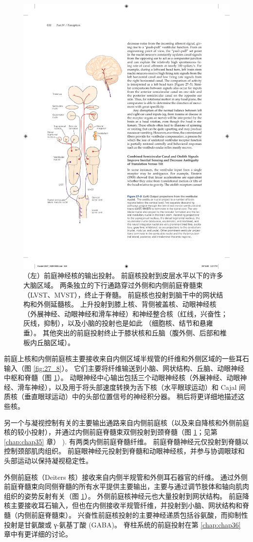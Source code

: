 \begin{figure}[htbp]
	\centering
	\includegraphics[width=0.4\linewidth]{chap27/fig_27_9}
	\caption{（左）前庭神经核的输出投射。 前庭核投射到皮层水平以下的许多大脑区域。 两条独立的下行通路穿过外侧和内侧前庭脊髓束（LVST、MVST），终止于脊髓。 前庭核也投射到脑干中的网状结构和外侧延髓核。 上升投射到膝上核、背侧被盖核、动眼神经核（外展神经、动眼神经和滑车神经）和神经整合核（红线，兴奋性；灰线，抑制），以及小脑的投射也是如此 （细胞核、结节和悬雍垂）。 其他突出的前庭投射终止于膝状核和丘脑（腹外侧、后部和椎板内丘脑区域）。}
	\label{fig:27_9}
\end{figure}

前庭上核和内侧前庭核主要接收来自内侧区域半规管的纤维和外侧区域的一些耳石输入（图 \ref{fig:27_8}）。 它们主要将纤维输送到小脑、网状结构、丘脑、动眼神经中枢和脊髓（图 \ref{fig:27_9}）。 动眼神经中心输出包括三个动眼神经核（外展神经、动眼神经、滑车神经），以及用于将头部速度转换为舌下核（水平眼球运动）和 Cajal 间质核（垂直眼球运动）中的头部位置信号的神经积分器。 稍后将更详细地描述这些核。

另一个与凝视控制有关的主要输出通路来自内侧前庭核（以及来自降核和外侧前庭核的较小投射），并通过内侧前庭脊髓束双侧投射到颈脊髓（图 \ref{fig:27_9}；见第 \ref{chap:chap35} 章） ). 有两类内侧前庭脊髓纤维。 前庭脊髓神经元仅投射到脊髓以控制颈部肌肉组织。 前庭眼神经元投射到脊髓和动眼神经核，并参与协调眼球和头部运动以保持凝视稳定性。

外侧前庭核（Deiters 核）接收来自内侧半规管和外侧耳石器官的纤维。 通过外侧前庭脊髓束向同侧脊髓的所有水平提供主要输出，主要与通过调节肢体和轴向肌肉组织的姿势反射有关（图 \ref{fig:27_9}）。 外侧前庭核神经元也大量投射到网状结构。 前庭降核主要接收耳石输入，但也在内侧接收半规管纤维，并投射到小脑、网状结构和脊髓（内侧前庭脊髓束）。 兴奋性前庭核投射的主要神经递质包括谷氨酸，而抑制性投射是甘氨酸或 γ-氨基丁酸 (GABA)。 脊柱系统的前庭投射在第 \ref{chap:chap36} 章中有更详细的讨论。

